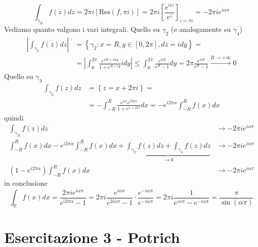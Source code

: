 \FloatBarrier

\begin{equation*}
\int _{\gamma _{R}} f\left( z\right) dz=2\pi i\left[\mathrm{Res}\left( f,\pi i\right)\right] =2\pi i\left[\frac{e^{\alpha z}}{e^{z}}\right]_{z=\pi i} =-2\pi ie^{i\alpha \pi }
\end{equation*}
Vediamo quanto valgono i vari integrali. Quello su $\gamma _{2}$ (e analogamente su $\gamma _{4}$)
\begin{align*}
\left| \int _{\gamma _{2}} f\left( z\right) dz\right|  & =\left\{\gamma _{2} :x=R,y\in \left[ 0,2\pi \right] ,dz=idy\right\} =\\
 & =\left| \int ^{2\pi }_{0}\frac{e^{\alpha R+i\alpha y}}{1+e^{R+iy}} idy\right| \leqslant \int ^{2\pi }_{0}\frac{e^{\alpha R}}{e^{R} -1} dy=2\pi \frac{e^{\alpha R}}{e^{R} -1}\xrightarrow{R\rightarrow +\infty } 0
\end{align*}
Quello su $\gamma _{3}$
\begin{align*}
\int _{\gamma _{3}} f\left( z\right) dz & =\left\{z=x+2\pi i\right\} =\\
 & =-\int ^{R}_{-R}\frac{e^{\alpha x} e^{i2\pi \alpha }}{1+e^{x+2\pi i}} dx=-e^{i2\pi \alpha }\int ^{R}_{-R} f\left( x\right) dx
\end{align*}
quindi
\begin{align*}
\int _{\gamma _{R}} f\left( z\right) dz & \rightarrow -2\pi ie^{i\alpha \pi }\\
\int ^{R}_{-R} f\left( x\right) dx-e^{i2\pi \alpha }\int ^{R}_{-R} f\left( x\right) dx+\underbrace{\int _{\gamma _{2}} f\left( z\right) dz+\int _{\gamma _{4}} f\left( z\right) dz}_{\rightarrow 0} & \rightarrow -2\pi ie^{i\alpha \pi }\\
\left( 1-e^{i2\pi \alpha }\right)\int ^{R}_{-R} f\left( x\right) dx & \rightarrow -2\pi ie^{i\alpha \pi }
\end{align*}
in conclusione
\begin{equation*}
\int _{\mathbb{R}} f\left( x\right) dx=\frac{2\pi ie^{i\alpha \pi }}{e^{i2\pi \alpha } -1} =2\pi i\frac{e^{i\alpha \pi }}{e^{2i\alpha \pi } -1} \cdotp \frac{e^{-i\alpha \pi }}{e^{-i\alpha \pi }} =2\pi i\frac{1}{e^{i\alpha \pi } -e^{-i\alpha \pi }} =\frac{\pi }{\sin\left( \alpha \pi \right)}
\end{equation*}
\chapter{Esercitazione 3 - Potrich}
\ParteEsercizi
\Esercizio{}

